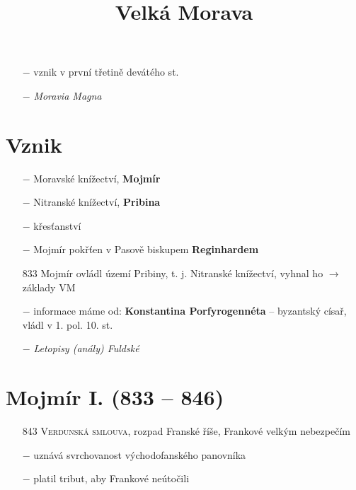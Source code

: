 \documentclass{article}
\title{\vspace{-2cm}Velká Morava\vspace{-1.7cm}}
\date{}
\author{}
\begin{document}
\maketitle
\begin{itemize}
    \vspace{-0.5em}
    \setlength\itemsep{0.15em}
    \item[$-$] vznik v první třetině devátého st.
    \item[$-$] \textit{Moravia Magna}
\end{itemize}

\section*{Vznik}
\begin{itemize}
    \vspace{-0.5em}
    \setlength\itemsep{0.15em}
    \item[$-$] Moravské knížectví, \textbf{Mojmír}
    \item[$-$] Nitranské knížectví, \textbf{Pribina}
    \item[$-$] křesťanství
    \item[$-$] Mojmír pokřťen v Pasově biskupem \textbf{Reginhardem}
    \item[833] Mojmír ovládl území Pribiny, t. j. Nitranské knížectví, vyhnal ho $\rightarrow$ základy VM
    \item[$-$] informace máme od: \textbf{Konstantina Porfyrogennéta} -- byzantský císař, vládl v 1. pol. 10. st.
    \item[$-$] \textit{Letopisy (anály) Fuldské}
\end{itemize}

\section*{Mojmír I. (833 -- 846)}
\begin{itemize}
    \vspace{-0.5em}
    \setlength\itemsep{0.15em}
    \item[843] \textsc{Verdunská smlouva}, rozpad Franské říše, Frankové velkým nebezpečím
    \item[$-$] uznává svrchovanost východofanského panovníka
    \item[$-$] platil tribut, aby Frankové neútočili
\end{itemize}
\end{document}
